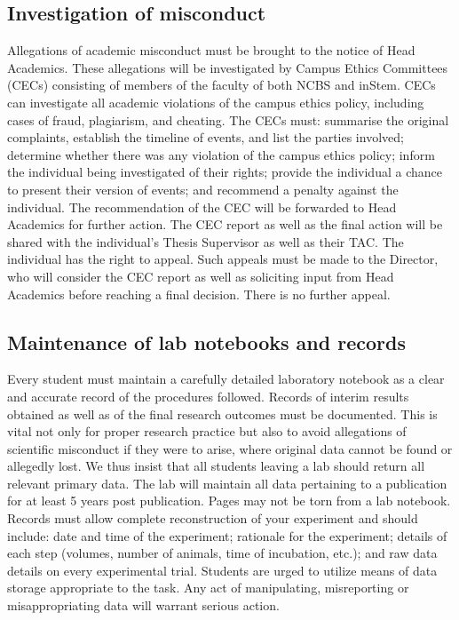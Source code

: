 \documentclass[a4paper]{extarticle}
\begin{document}
\subsection{Investigation of misconduct} Allegations of academic misconduct must
be brought to the notice of Head Academics. These allegations will be
investigated by Campus Ethics Committees (CECs) consisting of members of the
faculty of both NCBS and inStem. CECs can investigate all academic violations of
the campus ethics policy, including cases of fraud, plagiarism, and cheating.
The CECs must: summarise the original complaints, establish the timeline of
events, and list the parties involved; determine whether there was any violation
of the campus ethics policy; inform the individual being investigated of their
rights; provide the individual a chance to present their version of events; and
recommend a penalty against the individual. The recommendation of the CEC will
be forwarded to Head Academics for further action. The CEC report as well as the
final action will be shared with the individual’s Thesis Supervisor as well as
their TAC. The individual has the right to appeal. Such appeals must be made to
the Director, who will consider the CEC report as well as soliciting input from
Head Academics before reaching a final decision. There is no further appeal.

\subsection{Maintenance of lab notebooks and records} Every student must
maintain a carefully detailed laboratory notebook as a clear and accurate record
of the procedures followed.  Records of interim results obtained as well as of
the final research outcomes must be documented. This is vital not only for
proper research practice but also to avoid allegations of scientific misconduct
if they were to arise, where original data cannot be found or allegedly lost. We
thus insist that all students leaving a lab should return all relevant primary
data. The lab will maintain all data pertaining to a publication for at least 5
years post publication. Pages may not be torn from a lab notebook. Records must
allow complete reconstruction of your experiment and should include: date and
time of the experiment; rationale for the experiment; details of each step
(volumes, number of animals, time of incubation, etc.); and raw data details on
every experimental trial. Students are urged to utilize means of data storage
appropriate to the task. Any act of manipulating, misreporting or
misappropriating data will warrant serious action.
\end{document}
